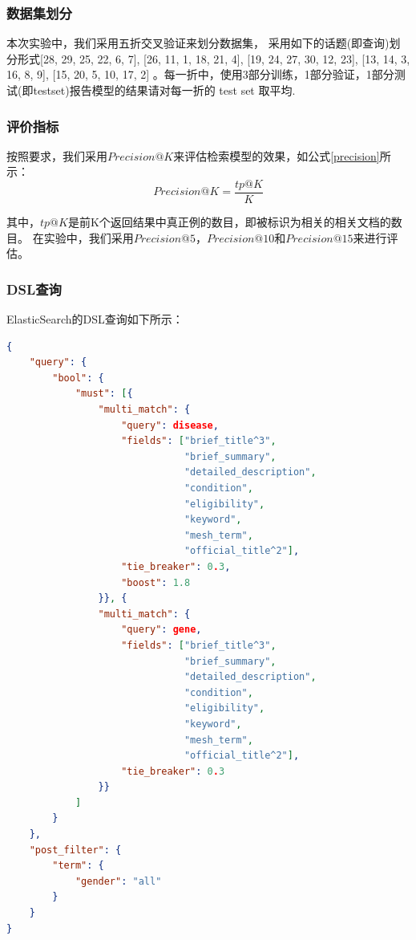 \documentclass[a4paper]{article}
\begin{document}
 \subsubsection{数据集划分}
本次实验中，我们采用五折交叉验证来划分数据集， 采用如下的话题(即查询)划分形式[28, 29, 25, 22, 6, 7], [26, 11, 1, 18, 21, 4], [19, 24, 27, 30, 12, 23], [13, 14, 3, 16, 8, 9], [15, 20, 5, 10, 17, 2] 。每一折中，使用3部分训练，1部分验证，1部分测试(即testset)报告模型的结果请对每一折的 test set 取平均.

\subsubsection{评价指标}
按照要求，我们采用$Precision@K$来评估检索模型的效果，如公式\eqref{precision}所示：
\begin{equation}
    \label{precision}
    Precision@K = \frac{tp@K}{K}
\end{equation}

其中，$tp@K$是前K个返回结果中真正例的数目，即被标识为相关的相关文档的数目。
在实验中，我们采用$Precision@5$，$Precision@10$和$Precision@15$来进行评估。

\subsubsection{DSL查询}
ElasticSearch的DSL查询如下所示：
\begin{lstlisting}[language=json,firstnumber=1]
{
    "query": {
        "bool": {
            "must": [{
                "multi_match": {
                    "query": disease,
                    "fields": ["brief_title^3", 
                               "brief_summary",
                               "detailed_description",
                               "condition",
                               "eligibility",
                               "keyword",
                               "mesh_term",
                               "official_title^2"],
                    "tie_breaker": 0.3,
                    "boost": 1.8
                }}, {
                "multi_match": {
                    "query": gene,
                    "fields": ["brief_title^3",
                               "brief_summary",
                               "detailed_description",
                               "condition",
                               "eligibility",
                               "keyword",
                               "mesh_term",
                               "official_title^2"],
                    "tie_breaker": 0.3
                }}
            ]
        }
    },
    "post_filter": {
        "term": {
            "gender": "all"
        }
    }
}
\end{lstlisting}
\end{document}
